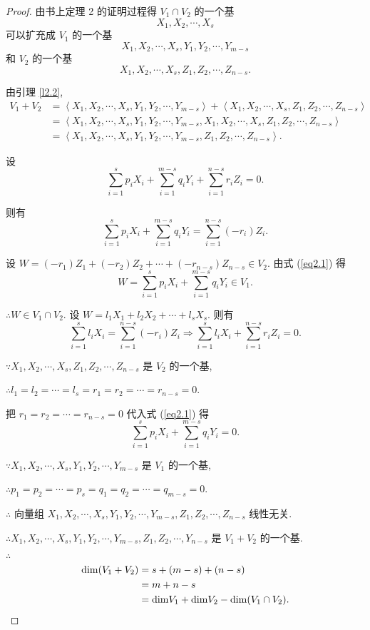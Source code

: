 \documentclass{ctexart}
\begin{document}
\begin{proof}
    由书上定理 2 的证明过程得 $V_1\cap V_2$ 的一个基
    \[X_1,X_2,\cdots,X_s\]
    可以扩充成 $V_1$ 的一个基
    \[X_1,X_2,\cdots,X_s,Y_1,Y_2,\cdots,Y_{m-s}\]
    和 $V_2$ 的一个基
    \[X_1,X_2,\cdots,X_s,Z_1,Z_2,\cdots,Z_{n-s}.\]

    由引理 \ref{l2.2},
    \begin{align*}
        V_1+V_2 & =\left<X_1,X_2,\cdots,X_s,Y_1,Y_2,\cdots,Y_{m-s}\right>+\left<X_1,X_2,\cdots,X_s,Z_1,Z_2,\cdots,Z_{n-s}\right> \\
        & =\left<X_1,X_2,\cdots,X_s,Y_1,Y_2,\cdots,Y_{m-s},X_1,X_2,\cdots,X_s,Z_1,Z_2,\cdots,Z_{n-s}\right> \\
        & =\left<X_1,X_2,\cdots,X_s,Y_1,Y_2,\cdots,Y_{m-s},Z_1,Z_2,\cdots,Z_{n-s}\right>.
    \end{align*}

    设
    \begin{equation}\label{eq2.1}
        \sum\limits_{i=1}^sp_iX_i+\sum\limits_{i=1}^{m-s}q_iY_i+\sum\limits_{i=1}^{n-s}r_iZ_i=0.
    \end{equation}

    则有
    \[\sum\limits_{i=1}^sp_iX_i+\sum\limits_{i=1}^{m-s}q_iY_i=\sum\limits_{i=1}^{n-s}(-r_i)Z_i.\]

    设 $W=(-r_1)Z_1+(-r_2)Z_2+\cdots+(-r_{n-s})Z_{n-s}\in V_2$. 由式 (\ref{eq2.1}) 得
    \[W=\sum\limits_{i=1}^sp_iX_i+\sum\limits_{i=1}^{m-s}q_iY_i\in V_1.\]

    $\therefore W\in V_1\cap V_2$. 设 $W=l_1X_1+l_2X_2+\cdots+l_sX_s$. 则有
    \[\sum\limits_{i=1}^sl_iX_i=\sum\limits_{i=1}^{n-s}(-r_i)Z_i\Rightarrow\sum\limits_{i=1}^sl_iX_i+\sum\limits_{i=1}^{n-s}r_iZ_i=0.\]

    $\because X_1,X_2,\cdots,X_s,Z_1,Z_2,\cdots,Z_{n-s}$ 是 $V_2$ 的一个基,

    $\therefore l_1=l_2=\cdots=l_s=r_1=r_2=\cdots=r_{n-s}=0$.

    把 $r_1=r_2=\cdots=r_{n-s}=0$ 代入式 (\ref{eq2.1}) 得
    \[\sum\limits_{i=1}^sp_iX_i+\sum\limits_{i=1}^{m-s}q_iY_i=0.\]

    $\because X_1,X_2,\cdots,X_s,Y_1,Y_2,\cdots,Y_{m-s}$ 是 $V_1$ 的一个基,

    $\therefore p_1=p_2=\cdots=p_s=q_1=q_2=\cdots=q_{m-s}=0$.

    $\therefore$ 向量组 $X_1,X_2,\cdots,X_s,Y_1,Y_2,\cdots,Y_{m-s},Z_1,Z_2,\cdots,Z_{n-s}$ 线性无关.

    $\therefore X_1,X_2,\cdots,X_s,Y_1,Y_2,\cdots,Y_{m-s},Z_1,Z_2,\cdots,Y_{n-s}$ 是 $V_1+V_2$ 的一个基.

    $\therefore$
    \begin{align*}
        \mathrm{dim}(V_1+V_2) & =s+(m-s)+(n-s) \\
        & =m+n-s \\
        & =\mathrm{dim}V_1+\mathrm{dim}V_2-\mathrm{dim}(V_1\cap V_2).\qedhere
    \end{align*}
\end{proof}
\end{document}
